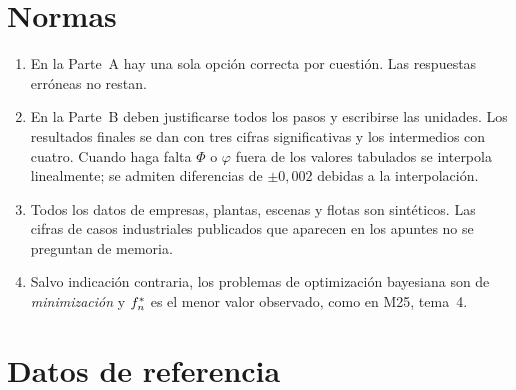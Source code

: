 \section*{Normas}
\begin{enumerate}[label=\arabic*.]
  \item En la Parte~A hay una sola opción correcta por cuestión. Las respuestas erróneas no restan.
  \item En la Parte~B deben justificarse todos los pasos y escribirse las unidades. Los resultados finales se dan con tres cifras significativas y los intermedios con cuatro. Cuando haga falta $\Phi$ o $\varphi$ fuera de los valores tabulados se interpola linealmente; se admiten diferencias de $\pm0{,}002$ debidas a la interpolación.
  \item Todos los datos de empresas, plantas, escenas y flotas son sintéticos. Las cifras de casos industriales publicados que aparecen en los apuntes no se preguntan de memoria.
  \item Salvo indicación contraria, los problemas de optimización bayesiana son de \emph{minimización} y $f^{\ast}_{n}$ es el menor valor observado, como en M25, tema~4.
\end{enumerate}

\section*{Datos de referencia}

